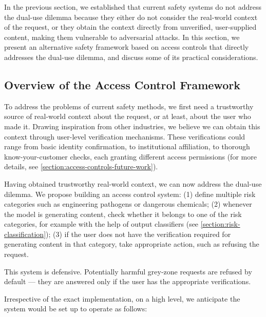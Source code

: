 \documentclass{article}
\theoremstyle{plain}
\theoremstyle{definition}
\theoremstyle{remark}
\begin{document}
In the previous section, we established that current safety systems
do not address the dual-use dilemma because they either do not
consider the real-world context of the request, or they obtain the
context directly from unverified, user-supplied content, making them vulnerable
to adversarial attacks. In this section, we present an alternative
safety framework based on access controls that directly addresses the
dual-use dilemma, and discuss some of its practical considerations.

\subsection{Overview of the Access Control Framework}

To address the problems of current safety methods, we first need a trustworthy source of real-world context about the request, or at least, about the user who made it.
Drawing inspiration from other industries, we believe we can obtain this context through user-level verification mechanisms.
These verifications could range from basic identity confirmation, to institutional affiliation, to thorough know-your-customer checks, each granting different access permissions (for more details, see \cref{section:access-controls-future-work}).

Having obtained trustworthy real-world context, we can now address the dual-use dilemma.
We propose building an access control system:
(1) define multiple risk categories such as engineering pathogens or dangerous chemicals;
(2) whenever the model is generating content, check whether it belongs to one of the risk categories, for example with the help of output classifiers (see \cref{section:risk-classification});
(3) if the user does not have the verification required for generating content in that category, take appropriate action, such as refusing the request.

This system is defensive.
Potentially harmful grey-zone requests are refused by default --- they are answered only if the user has the appropriate verifications.

Irrespective of the exact implementation, on a high level, we anticipate the system would be set up to operate as follows:
\end{document}
